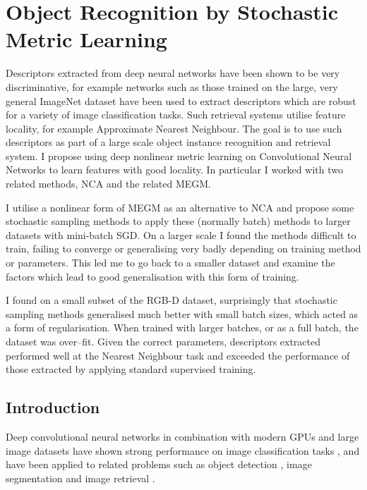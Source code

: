 
\chapter{Object Recognition by Stochastic Metric Learning}
\label{chap:metric} 

Descriptors extracted from deep neural networks have been shown to be very discriminative,
for example networks such as those trained on the large, very general ImageNet dataset have been used to extract descriptors which are robust for a variety of image classification tasks. Such retrieval systems utilise feature locality, for example Approximate Nearest Neighbour. The goal is to use such descriptors as part of a large scale object instance recognition and retrieval system. I propose using deep nonlinear metric learning on Convolutional Neural Networks to learn features with good locality. In particular I worked with two related methods, \gls{NCA} and the related \gls{MEGM}.

I utilise a nonlinear form of \gls{MEGM} as an alternative to \gls{NCA} and propose some stochastic sampling methods to apply these (normally batch) methods to larger datasets with mini-batch \gls{SGD}. On a larger scale I found the methods difficult to train, failing to converge or generalising very badly depending on training method or parameters. This led me to go back to a smaller dataset and examine the factors which lead to good generalisation with this form of training.
  
I found on a small subset of the RGB-D dataset, surprisingly that  stochastic sampling methods
 generalised much better with small batch sizes, which acted as a form of regularisation. When trained with larger batches, or as a full batch, the dataset was over--fit. Given the correct parameters, descriptors extracted performed well at the Nearest Neighbour task and exceeded the performance of those extracted by applying standard supervised training.





\section{Introduction}

Deep convolutional neural networks in combination with modern \gls{GPU}s and large image datasets have shown strong performance on image classification tasks \cite {Krizhevsky2012}, and have been applied to related problems such as object detection \cite{Sermanet2013}, image segmentation \cite{Masci2013} and image retrieval \cite{Razavian2014}.

